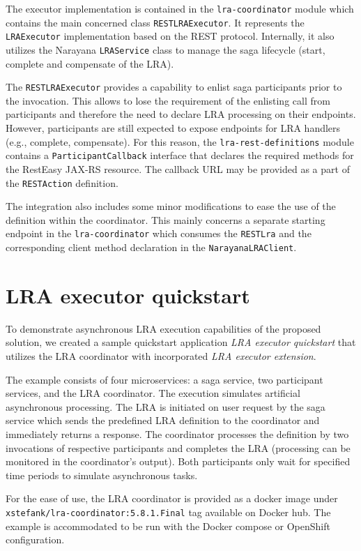\documentclass[oneside,
  digital, %
  table,   %
  lof,     %
  lot,     %
]{fithesis3}
\begin{document}
The executor implementation is contained in the \texttt{lra-coordinator} module which contains the main concerned class \texttt{RESTLRAExecutor}. It represents the \texttt{LRAExecutor} implementation based on the REST protocol. Internally, it also utilizes the Narayana \texttt{LRAService} class to manage the saga lifecycle (start, complete and compensate of the LRA).

The \texttt{RESTLRAExecutor} provides a capability to enlist saga participants prior to the invocation. This allows to lose the requirement of the enlisting call from participants and therefore the need to declare LRA processing on their endpoints. However, participants are still expected to expose endpoints for LRA handlers (e.g., complete, compensate). For this reason, the \texttt{lra-rest-definitions} module contains a \texttt{ParticipantCallback} interface that declares the required methods for the RestEasy JAX-RS resource. The callback URL may be provided as a part of the \texttt{RESTAction} definition.

The integration also includes some minor modifications to ease the use of the definition within the coordinator. This mainly concerns a separate starting endpoint in the \texttt{lra-coordinator} which consumes the \texttt{RESTLra} and the corresponding client method declaration in the \texttt{NarayanaLRAClient}.

\section{LRA executor quickstart}

To demonstrate asynchronous LRA execution capabilities of the proposed solution, we created a sample quickstart application \textit{LRA executor quickstart} that utilizes the LRA coordinator with incorporated \textit{LRA executor extension}. 

The example consists of four microservices: a saga service, two participant services, and the LRA coordinator. The execution simulates artificial asynchronous processing. The LRA is initiated on user request by the saga service which sends the predefined LRA definition to the coordinator and immediately returns a response. The coordinator processes the definition by two invocations of respective participants and completes the LRA (processing can be monitored in the coordinator's output). Both participants only wait for specified time periods to simulate asynchronous tasks.

For the ease of use, the LRA coordinator is provided as a docker image under \texttt{xstefank/lra-coordinator:5.8.1.Final} tag available on Docker hub. The example is accommodated to be run with the Docker compose or OpenShift configuration.
\end{document}
